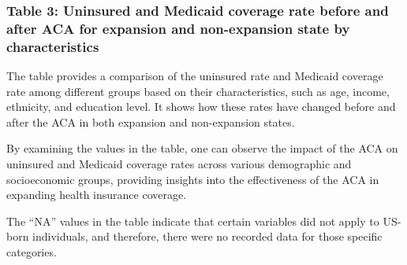 \documentclass[
]{article}
\begin{document}
\hypertarget{table-3-uninsured-and-medicaid-coverage-rate-before-and-after-aca-for-expansion-and-non-expansion-state-by-characteristics}{%
\subsubsection{Table 3: Uninsured and Medicaid coverage rate before and
after ACA for expansion and non-expansion state by
characteristics}\label{table-3-uninsured-and-medicaid-coverage-rate-before-and-after-aca-for-expansion-and-non-expansion-state-by-characteristics}}

The table provides a comparison of the uninsured rate and Medicaid
coverage rate among different groups based on their characteristics,
such as age, income, ethnicity, and education level. It shows how these
rates have changed before and after the ACA in both expansion and
non-expansion states.

By examining the values in the table, one can observe the impact of the
ACA on uninsured and Medicaid coverage rates across various demographic
and socioeconomic groups, providing insights into the effectiveness of
the ACA in expanding health insurance coverage.

The ``NA'' values in the table indicate that certain variables did not
apply to US-born individuals, and therefore, there were no recorded data
for those specific categories.

\renewcommand{\arraystretch}{0.7}

\begingroup\fontsize{6.5}{8.5}\selectfont
\end{document}

